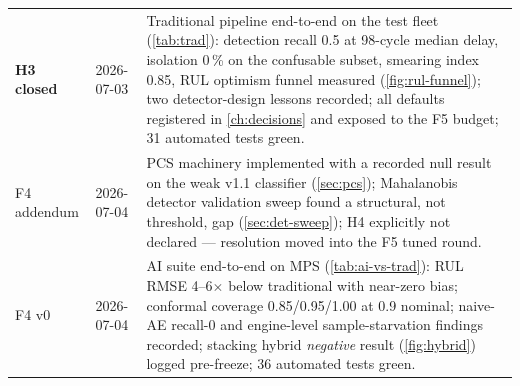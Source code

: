\begin{table}[htbp]
\begin{tabular}{lp{}p{}}
    \textbf{H3 closed} & 2026-07-03 & Traditional pipeline end-to-end on the test fleet
      (\cref{tab:trad}): detection recall 0.5 at 98-cycle median delay, isolation 0\,\% on
      the confusable subset, smearing index 0.85, RUL optimism funnel measured
      (\cref{fig:rul-funnel}); two detector-design lessons recorded; all defaults registered
      in \cref{ch:decisions} and exposed to the F5 budget; 31 automated tests green. \\
    F4 addendum & 2026-07-04 & PCS machinery implemented with a
      recorded null result on the weak v1.1 classifier (\cref{sec:pcs}); Mahalanobis
      detector validation sweep found a structural, not threshold, gap
      (\cref{sec:det-sweep}); H4 explicitly not declared --- resolution moved into the F5
      tuned round. \\
    F4 v0 & 2026-07-04 & AI suite end-to-end on MPS (\cref{tab:ai-vs-trad}): RUL RMSE
      4--6$\times$ below traditional with near-zero bias; conformal coverage
      0.85/0.95/1.00 at 0.9 nominal; naive-AE recall-0 and engine-level sample-starvation
      findings recorded; stacking hybrid \emph{negative} result (\cref{fig:hybrid}) logged
      pre-freeze; 36 automated tests green. \\
    \bottomrule
  \end{tabular}
\end{table}
